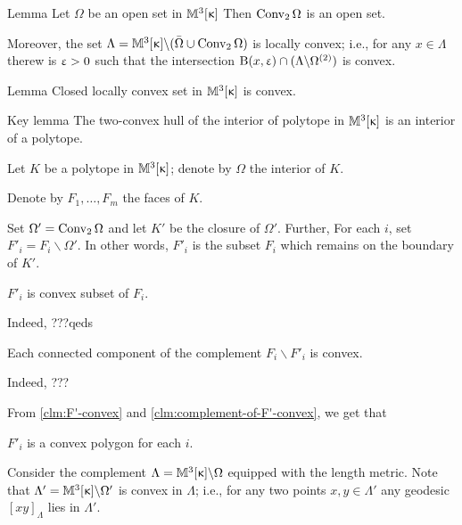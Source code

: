\begin{thm}{Lemma}\label{lem:loc-concave}
Let $\Omega$ be an open set in $\mathbb{M}_{{}}^{3}[{\upkappa}]$
Then $\mathop{\rm Conv}\nolimits_2\Omega$ is an open set.
 
Moreover, the set $\Lambda=\Lob{3}{\kappa}\backslash(\bar\Omega\cup\Conv_2\Omega)$
 is locally convex;
i.e., for any $x\in\Lambda$ therew is $\upvarepsilon>0$ such that the intersection
$\oBall(x,\eps)\cap(\Lambda\backslash\Omega^{(2)})$
is convex.
\end{thm}

\begin{thm}{Lemma}
Closed locally convex set in $\mathbb{M}_{{}}^{3}[{\upkappa}]$ is convex. 
\end{thm}




\begin{thm}{Key lemma}
The two-convex hull of the interior of polytope in $\mathbb{M}_{{}}^{3}[{\upkappa}]$
is an interior of a polytope.
\end{thm}

Let $K$ be a polytope in $\mathbb{M}_{{}}^{3}[{\upkappa}]$;
denote by $\Omega$ the interior of $K$.

Denote by $F_1,\dots,F_m$ the faces of $K$.

Set $\Omega'=\mathop{\rm Conv}\nolimits_2\Omega$ and let $K'$ be the closure of $\Omega'$.
Further, 
For each $i$, 
set $F'_i=F_i\backslash \Omega'$.
In other words, $F'_i$ is the subset $F_i$ which remains on the boundary of $K'$.

\begin{clm}{}\label{clm:F'-convex}
$F'_i$ is convex subset of $F_i$.
\end{clm}

Indeed, ???qeds

\begin{clm}{}\label{clm:complement-of-F'-convex}
Each connected component of the complement $F_i\backslash F'_i$ is convex.
\end{clm}

Indeed, ???\claimqeds

From \ref{clm:F'-convex} and \ref{clm:complement-of-F'-convex}, we get that 

\begin{clm}{}$F'_i$ is a convex polygon for each $i$.
\end{clm}

Consider the complement 
$\Lambda=\mathbb{M}_{{}}^{3}[{\upkappa}]\backslash \Omega$ equipped with the length metric.
Note that $\Lambda'=\mathbb{M}_{{}}^{3}[{\upkappa}]\backslash \Omega'$
is convex in $\Lambda$;
i.e., for any two points $x,y\in \Lambda'$ any geodesic
$[xy]_\Lambda$ lies in $\Lambda'$.

